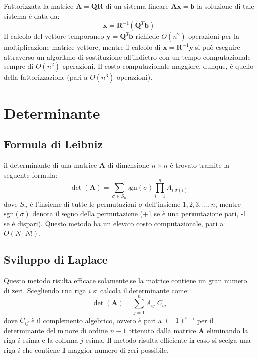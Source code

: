 \documentclass[10pt]{article}
\begin{document}
Fattorizzata la matrice $\mathbf{A}=\mathbf{Q}\mathbf{R}$ di un sistema lineare $\mathbf{A}\mathbf{x}=\mathbf{b}$ la soluzione di tale sistema è data da:
\begin{equation}
\mathbf{x} = \mathbf{R}^{-1} (\mathbf{Q}^T \mathbf{b})
\end{equation}
Il calcolo del vettore temporaneo $\mathbf{y} = \mathbf{Q}^T \mathbf{b}$ richiede $O(n^2)$ operazioni per la moltiplicazione matrice-vettore, mentre il calcolo di $\mathbf{x}=\mathbf{R}^{-1}\mathbf{y}$ si può eseguire attraverso un algoritmo di sostituzione all'indietro con un tempo computazionale sempre di $O(n^2)$ operazioni. Il costo computazionale maggiore, dunque, è quello della fattorizzazione (pari a $O(n^3)$ operazioni).









\section{Determinante}

\subsection{Formula di Leibniz}

il determinante di una matrice $\mathbf{A}$ di dimensione $n\times n$ è trovato tramite la seguente formula:
\begin{equation}
\det(\mathbf{A}) = \sum_{\sigma\in S_n} \text{sgn}(\sigma) \prod_{i=1}^n A_{i\;\sigma(i)}
\end{equation}
dove $S_n$ è l'insieme di tutte le permutazioni $\sigma$ dell'insieme ${1,2,3,\ldots,n}$, mentre $\text{sgn}(\sigma)$ denota il segno della permutazione (+1 se è una permutazione pari, -1 se è dispari).
Questo metodo ha un elevato costo computazionale, pari a $O(N\cdot N!)$.

\subsection{Sviluppo di Laplace}

Questo metodo risulta efficace solamente se la matrice contiene un gran numero di zeri. Scegliendo una riga $i$ si calcola il determinante come:
\begin{equation}
\det(\mathbf{A}) = \sum_{j=1}^n A_{ij} \; C_{ij}
\end{equation}
dove $C_{ij}$ è il complemento algebrico, ovvero è pari a $(-1)^{i+j}$ per il determinante del minore di ordine $n-1$ ottenuto dalla matrice $\mathbf{A}$ eliminando la riga $i$-esima e la colonna $j$-esima.
Il metodo risulta efficiente in caso si scelga una riga $i$ che contiene il maggior numero di zeri possibile.
\end{document}
